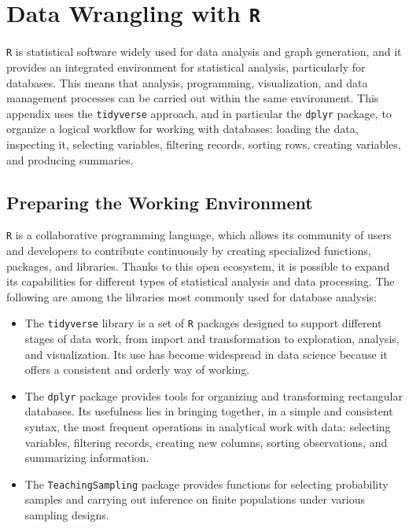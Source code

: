 \documentclass[
  english,
  12pt,
]{book}
\begin{document}
\appendix


\chapter{\texorpdfstring{Data Wrangling with \texttt{R}}{Data Wrangling with R}}\label{ap1}

\texttt{R} is statistical software widely used for data analysis and graph generation, and it provides an integrated environment for statistical analysis, particularly for databases. This means that analysis, programming, visualization, and data management processes can be carried out within the same environment. This appendix uses the \texttt{tidyverse} approach, and in particular the \texttt{dplyr} package, to organize a logical workflow for working with databases: loading the data, inspecting it, selecting variables, filtering records, sorting rows, creating variables, and producing summaries.

\section{Preparing the Working Environment}\label{preparacion-del-entorno-de-trabajo}

\texttt{R} is a collaborative programming language, which allows its community of users and developers to contribute continuously by creating specialized functions, packages, and libraries. Thanks to this open ecosystem, it is possible to expand its capabilities for different types of statistical analysis and data processing. The following are among the libraries most commonly used for database analysis:

\begin{itemize}
\item
  The \texttt{tidyverse} library \citep{tidyverse2026} is a set of \texttt{R} packages designed to support different stages of data work, from import and transformation to exploration, analysis, and visualization. Its use has become widespread in data science because it offers a consistent and orderly way of working.
\item
  The \texttt{dplyr} package \citep{dplyr2026} provides tools for organizing and transforming rectangular databases. Its usefulness lies in bringing together, in a simple and consistent syntax, the most frequent operations in analytical work with data: selecting variables, filtering records, creating new columns, sorting observations, and summarizing information.
\item
  The \texttt{TeachingSampling} package \citep{GutierrezT2020} provides functions for selecting probability samples and carrying out inference on finite populations under various sampling designs.
\end{itemize}
\end{document}
